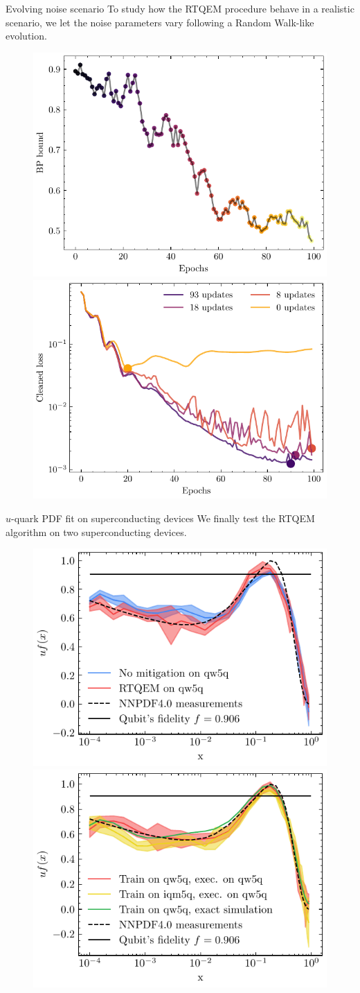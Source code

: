 \documentclass[20pt, final]{beamer}
\newlength{\colwidth}
\begin{document}
\begin{frame}[t]
\begin{columns}[t]
\begin{column}{\colwidth}
\begin{block}{Evolving noise scenario}
To study how the RTQEM procedure behave in a realistic scenario, we let the noise 
parameters vary following a Random Walk-like evolution.
\begin{figure}
  \centering
    \includegraphics[width=0.49\linewidth]{figures/bound_variation.pdf}%
    \includegraphics[width=0.5\linewidth]{figures/cleaned_losses.pdf}%
    \label{fig:ndim_simulation}
  \end{figure}
\end{block}

\begin{block}{$u$-quark PDF fit on superconducting devices}
We finally test the RTQEM algorithm on two superconducting devices.
\begin{figure}
  \centering
    \includegraphics[width=0.5\linewidth]{figures/qw5q_short.pdf}%
    \includegraphics[width=0.5\linewidth]{figures/benchs.pdf}%
    \label{fig:hdw}
  \end{figure}
\end{block}


\end{column}
\end{columns}
\end{frame}
\end{document}
